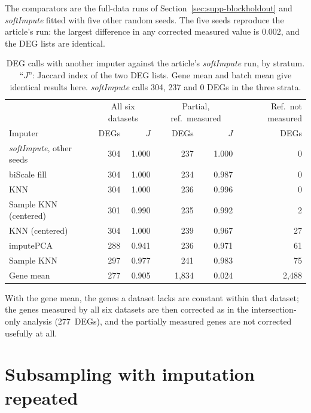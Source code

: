 \documentclass[11pt,a4paper]{article}
\begin{document}
The comparators are the full-data runs of
Section~\ref{sec:supp-blockholdout} and \textit{softImpute} fitted
with five other random seeds. The five seeds reproduce the
article's run: the largest difference in any corrected measured
value is $0.002$, and the DEG lists are identical.

\begin{table}[htbp]
\centering
\caption{DEG calls with another imputer against the article's
  \textit{softImpute} run, by stratum. ``$J$'': Jaccard index of
  the two DEG lists. Gene mean and batch mean give identical
  results here. \textit{softImpute} calls 304, 237 and 0 DEGs in
  the three strata.}
\label{tab:supp-influence}
\begin{tabular}{lrrrrr}
\toprule
 & \multicolumn{2}{c}{All six datasets} & \multicolumn{2}{c}{Partial, ref.\ measured} & Ref.\ not measured \\
Imputer & DEGs & $J$ & DEGs & $J$ & DEGs \\
\midrule
\textit{softImpute}, other seeds & 304 & 1.000 & 237 & 1.000 & 0 \\
biScale fill            & 304 & 1.000 & 234 & 0.987 & 0 \\
KNN                     & 304 & 1.000 & 236 & 0.996 & 0 \\
Sample KNN (centered)   & 301 & 0.990 & 235 & 0.992 & 2 \\
KNN (centered)          & 304 & 1.000 & 239 & 0.967 & 27 \\
imputePCA               & 288 & 0.941 & 236 & 0.971 & 61 \\
Sample KNN              & 297 & 0.977 & 241 & 0.983 & 75 \\
Gene mean               & 277 & 0.905 & 1{,}834 & 0.024 & 2{,}488 \\
\bottomrule
\end{tabular}
\end{table}

With the gene mean, the genes a dataset lacks are constant within
that dataset; the genes measured by all six datasets are then
corrected as in the intersection-only analysis (277~DEGs), and the
partially measured genes are not corrected usefully at all.

\section{Subsampling with imputation repeated}
\label{sec:supp-reimpute}
\end{document}
